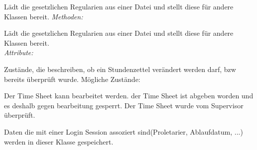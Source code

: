 \begin{itemize}
                Lädt die gesetzlichen Regularien aus einer Datei und stellt diese für andere Klassen bereit.
                \emph{Methoden:}
                \begin{itemize}
                \end{itemize}

                Lädt die gesetzlichen Regularien aus einer Datei und stellt diese für andere Klassen bereit.\\
                \emph{Attribute:}
                    \begin{itemize}
                    \end{itemize}


                Zustände, die beschreiben, ob ein Stundenzettel verändert werden darf, bzw bereits überprüft wurde.
                Mögliche Zustände:
                \begin{itemize}
                        Der Time Sheet kann bearbeitet werden.
                        der Time Sheet ist abgeben worden und es deshalb gegen bearbeitung gesperrt.
                        Der Time Sheet wurde vom Supervisor überprüft.
                \end{itemize}

                Daten die mit einer Login Session assoziert sind(Proletarier, Ablaufdatum, ...) werden in dieser Klasse gespeichert.
                \begin{itemize}
                \end{itemize}


        \end{itemize}

